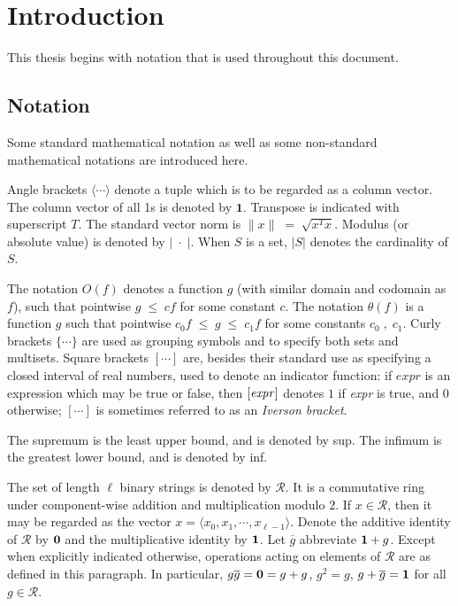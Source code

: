 \chapter{Introduction} \label{ch:introduction}
This thesis begins with notation that is used throughout this document.
\section{Notation}
Some standard mathematical notation as well as some non-standard mathematical notations are introduced here.

Angle brackets $\langle \cdots \rangle$ denote a tuple which is to be regarded as a column
vector. The column vector of all 1s is denoted by $\bm{1}$. Transpose is indicated with superscript $T$. 
The standard vector norm is $\|x\| \;=\; \sqrt{x^T x}$. Modulus (or absolute value) is denoted by $|\; \cdot \;|$. 
When $S$ is a set, $|S|$ denotes the cardinality of $S$.

The notation $O(f)$ denotes a function $g$ (with similar domain and codomain as
$f$), such that pointwise $g \;\leq \;c f$ for some constant $c$. 
The notation $\theta(f)$ is a function $g$ such that pointwise 
$c_0 f \;\leq\; g \;\leq\; c_1 f$ for some constants $c_0 \;,\; c_1$. 
Curly brackets $\{\cdots\}$ are used as grouping symbols and to specify both sets
and multisets. Square brackets $[ \cdots ]$ are, besides their standard use as specifying 
a closed interval of real numbers, used to denote an indicator function:
if $expr$ is an expression which may be true or false, then
$[\mbox{\em expr\/} ]$ denotes $1$ if {\em expr\/} is
true, and $0$ otherwise; $[ \cdots ]$ is sometimes referred to as an {\em Iverson bracket}. 

The supremum is the least upper bound, and is denoted by sup. The infimum
is the greatest lower bound, and is denoted by inf.

The set of length $\ell$ binary strings is denoted by $\mathcal{R}$. It is a
commutative ring under component-wise addition and
multiplication modulo $2$. If $x \in \mathcal{R}$, then it may 
be regarded as the vector $x = \langle x_0, x_1, \cdots, x_{\ell - 1} \rangle$. 
Denote the additive identity of $\mathcal{R}$ by ${\bf 0}$ and the
multiplicative identity by ${\bf 1}$. Let $\overline{g}$
abbreviate ${\bf 1} + g$.  Except when explicitly indicated otherwise,
operations acting on elements of $\mathcal{R}$ are as defined in this
paragraph. In particular, $g \overline{g} = {\bf 0} = g+g$,
  $g^2 = g$, $g + \overline{g} = {\bf 1}$ for all $g \in
  \mathcal{R}$.


